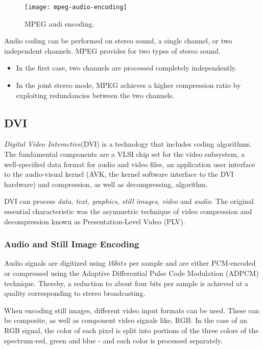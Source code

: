 \begin{figure}[ht!]
	\centering
	\texttt{[image: mpeg-audio-encoding]}
	\caption{MPEG audi encoding.}
	\label{fig:mpeg-audio-encoding}
\end{figure}

Audio coding can be performed on stereo sound, a single channel, or two independent channels. MPEG provides for two types of stereo sound. 
\begin{itemize}
	\item In the first case, two channels are processed completely independently. 
	\item In the joint stereo mode, MPEG achieves a higher compression ratio by exploiting redundancies between the two	channels.
\end{itemize}

\subsection{DVI}
\textit{Digital Video Interactive}(DVI) is a technology that includes coding algorithms. The fundamental components are a VLSI chip set for the video subsystem, a well-specified data format for audio and video files, an application user interface to the audio-visual kernel (AVK, the kernel software interface to the DVI hardware) and compression, as well as decompressing, algorithm. 

DVI can process\textit{ data, text, graphics, still images, video} and \textit{audio}. The original essential characteristic was the asymmetric technique of video compression and decompression known as Presentation-Level Video (PLV).

\subsubsection{Audio and Still Image Encoding}
Audio signals are digitized using $ 16 bits $ per sample and are either PCM-encoded or compressed using the Adaptive Differential Pulse Code Modulation (ADPCM) technique. Thereby, a reduction to about four bits per sample is achieved at a quality corresponding to stereo broadcasting.

When encoding still images, different video input formats can be used. These can be composite, as well as component video signals like, RGB. In the case of an RGB signal, the color of each pixel is split into portions of the three colors of the spectrum-red, green and blue - and each color is processed separately.

